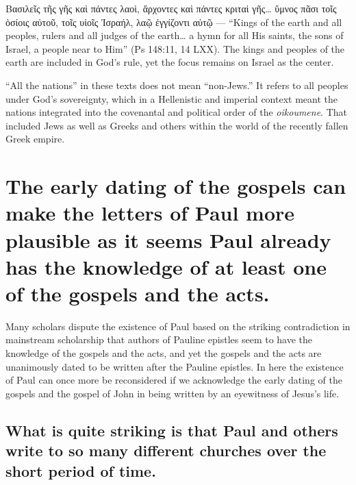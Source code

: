 Βασιλεῖς τῆς γῆς καὶ πάντες λαοὶ, ἄρχοντες καὶ πάντες κριταὶ γῆς… ὕμνος πᾶσι τοῖς ὁσίοις αὐτοῦ, τοῖς υἱοῖς Ἰσραήλ, λαῷ ἐγγίζοντι αὐτῷ — “Kings of the earth and all peoples, rulers and all judges of the earth… a hymn for all His saints, the sons of Israel, a people near to Him” (Ps 148:11, 14 LXX).
The kings and peoples of the earth are included in God’s rule, yet the focus remains on Israel as the center.


“All the nations” in these texts does not mean “non-Jews.”
It refers to all peoples under God’s sovereignty, which in a Hellenistic and imperial context meant the nations integrated into the covenantal and political order of the \textit{oikoumene}.
That included Jews as well as Greeks and others within the world of the recently fallen Greek empire.

\section{The early dating of the gospels can make the letters of Paul more plausible as it seems Paul already has the knowledge of at least one of the gospels and the acts.}\label{sec:the-early-dating-of-the-gospels-can-make-the-letters-of-paul-more-plausible-as-it-seems-paul-already-has-the-knowledge-of-at-least-one-of-the-gospels-and-the-acts.}

Many scholars dispute the existence of Paul based on the striking contradiction in mainstream scholarship that authors of Pauline epistles seem to have the knowledge of the gospels and the acts, and yet the gospels and the acts are unanimously dated to be written after the Pauline epistles.
In here the existence of Paul can once more be reconsidered if we acknowledge the early dating of the gospels and the gospel of John in being written by an eyewitness of Jesus's life.

\subsection{What is quite striking is that Paul and others write to so many different churches over the short period of time.}\label{subsec:what-is-quite-striking-is-that-paul-and-others-write-to-so-many-different-churches-over-the-short-period-of-time.}

